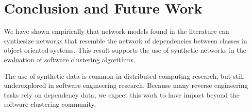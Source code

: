 %
%
%
%
%
%
%

\section{Conclusion and Future Work}

We have shown empirically that network models found in the literature can
synthesize networks that resemble the network of dependencies between classes in
object-oriented systems. This result supports the use of synthetic networks in
the evaluation of software clustering algorithms.

The use of synthetic data is common in distributed computing research, but still
underexplored in software engineering research. Because many reverse engineering
tasks rely on dependency data, we expect this work to have impact beyond the
software clustering community.


